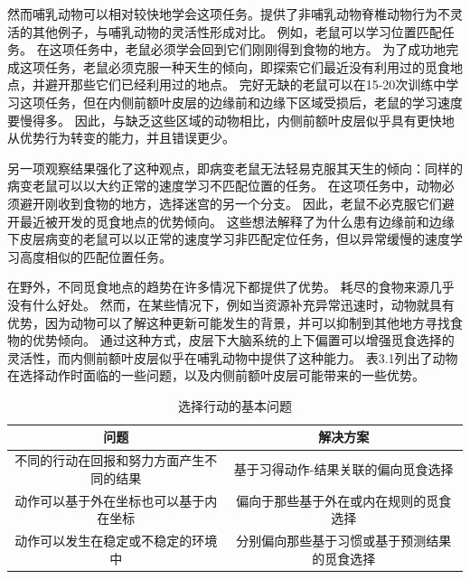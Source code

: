 然而哺乳动物可以相对较快地学会这项任务。\cite{murray2011can}提供了非哺乳动物脊椎动物行为不灵活的其他例子，与哺乳动物的灵活性形成对比。
例如，老鼠可以学习位置匹配任务。
在这项任务中，老鼠必须学会回到它们刚刚得到食物的地方\cite{marighetto1998effects}。
为了成功地完成这项任务，老鼠必须克服一种天生的倾向，即探索它们最近没有利用过的觅食地点，并避开那些它们已经利用过的地点。
完好无缺的老鼠可以在15-20次训练中学习这项任务，但在内侧前额叶皮层的边缘前和边缘下区域受损后，老鼠的学习速度要慢得多\cite{dias2000effects}。
因此，与缺乏这些区域的动物相比，内侧前额叶皮层似乎具有更快地从优势行为转变的能力，并且错误更少。\par


另一项观察结果强化了这种观点，即病变老鼠无法轻易克服其天生的倾向：同样的病变老鼠可以以大约正常的速度学习不匹配位置的任务\cite{dias2000effects}。
在这项任务中，动物必须避开刚收到食物的地方，选择迷宫的另一个分支。
因此，老鼠不必克服它们避开最近被开发的觅食地点的优势倾向。
这些想法解释了为什么患有边缘前和边缘下皮层病变的老鼠可以以正常的速度学习非匹配定位任务，但以异常缓慢的速度学习高度相似的匹配位置任务。\par


在野外，不同觅食地点的趋势在许多情况下都提供了优势。
耗尽的食物来源几乎没有什么好处。
然而，在某些情况下，例如当资源补充异常迅速时，动物就具有优势，因为动物可以了解这种更新可能发生的背景，并可以抑制到其他地方寻找食物的优势倾向。
通过这种方式，皮层下大脑系统的上下偏置可以增强觅食选择的灵活性，而内侧前额叶皮层似乎在哺乳动物中提供了这种能力。
表3.1列出了动物在选择动作时面临的一些问题，以及内侧前额叶皮层可能带来的一些优势。\par


\begin{table}[htbp]
	\newcommand{\tabincell}[2]{\begin{tabular}{@{}#1@{}}#2\end{tabular}} %
	\centering
	\caption{选择行动的基本问题}
	\renewcommand\arraystretch{1.5}	%
	\begin{tabular}{c c }	 %
		\hline	%
		问题 & 解决方案 \\	
		\hline  %
		不同的行动在回报和努力方面产生不同的结果 & 基于习得动作-结果关联的偏向觅食选择 \\
		\hline
		动作可以基于外在坐标也可以基于内在坐标 & 偏向于那些基于外在或内在规则的觅食选择 \\
		\hline
		动作可以发生在稳定或不稳定的环境中 & 分别偏向那些基于习惯或基于预测结果的觅食选择 \\
		\hline
	\end{tabular}%
\end{table}%



